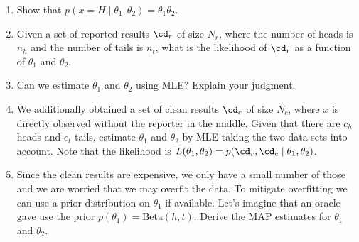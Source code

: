 \documentclass{article}
\theoremstyle{plain}
\theoremstyle{definition}
\begin{document}
\begin{enumerate}
  \setcounter{enumi}{\value{saveenum}}
\item Show that $p(x=H\mid \theta_1, \theta_2) = \theta_1 \theta_2$.

\item Given a set of reported results $\cd_r$ of size $N_r$, where the number of heads is $n_h$ and the number of tails is $n_t$, what is the likelihood of $\cd_r$ as a function of $\theta_1$ and $\theta_2$.

\item Can we estimate $\theta_1$ and $\theta_2$ using MLE? Explain your judgment.

\item We additionally obtained a set of clean results $\cd_c$ of size $N_c$, where $x$ is directly observed without the reporter in the middle. Given that there are $c_h$ heads and $c_t$ tails,
estimate $\theta_1$ and $\theta_2$ by MLE taking the two data sets into account.
Note that the likelihood is $L(\theta_1, \theta_2) = p(\cd_r, \cd_c\mid \theta_1, \theta_2)$.

\item Since the clean results are expensive, we only have a small number of those and we are worried that we may overfit the data.
To mitigate overfitting we can use a prior distribution on $\theta_1$ if available. Let's imagine that an oracle gave use the prior $p(\theta_1) = \text{Beta}(h, t)$.
Derive the MAP estimates for $\theta_1$ and $\theta_2$.

\setcounter{saveenum}{\value{enumi}}
\end{enumerate}
\end{document}

